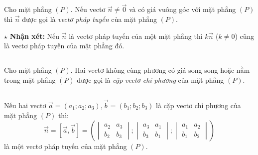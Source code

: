 \documentclass[12pt,a4paper]{extarticle}
\begin{document}
\makeheadbox[headerright={Chương 5},chude={Bài 1},tieude={Phương trình mặt phẳng},dinhdang={Hình học},lop={12 },gv={Nguyễn Lê Minh Ngọc}]
\vspace{2em}



\section*{\color{myblue}{I. Vectơ pháp tuyến, cặp vectơ chỉ phương của mặt phẳng}}
\subsection*{\color{myblue}{1. Vectơ pháp tuyến}}
\begin{tcolorbox}[colback=lightblue, colframe=myblue, arc=2mm]
Cho mặt phẳng $(P)$. Nếu vectơ $\vec{n} \neq \vec{0}$ và có giá vuông góc với mặt phẳng $(P)$ thì $\vec{n}$ được gọi là \textit{vectơ pháp tuyến} của mặt phẳng $(P)$.
\end{tcolorbox}
\noindent $\star$ \textbf{Nhận xét:} Nếu $\vec{n}$ là vectơ pháp tuyến của một mặt phẳng thì $k\vec{n}$ ($k \neq 0$) cũng là vectơ pháp tuyến của mặt phẳng đó.
\subsection*{\color{myblue}{2. Cặp vectơ chỉ phương}}
\begin{tcolorbox}[colback=lightblue, colframe=myblue, arc=2mm]
Cho mặt phẳng $(P)$. Hai vectơ không cùng phương có giá song song hoặc nằm trong mặt phẳng $(P)$ được gọi là \textit{cặp vectơ chỉ phương} của mặt phẳng $(P)$.
\end{tcolorbox}
\subsection*{\color{myblue}{3. Xác định vectơ pháp tuyến khi biết cặp vectơ chỉ phương}}
\begin{tcolorbox}[colback=lightblue, colframe=myblue, arc=2mm]
Nếu hai vectơ $\vec{a} = (a_1; a_2; a_3), \vec{b} = (b_1; b_2; b_3)$ là cặp vectơ chỉ phương của mặt phẳng $(P)$ thì:
\[
\vec{n} = [\vec{a}, \vec{b}] = \left( 
\begin{vmatrix} a_2 & a_3 \\ b_2 & b_3 \end{vmatrix}; 
\begin{vmatrix} a_3 & a_1 \\ b_3 & b_1 \end{vmatrix}; 
\begin{vmatrix} a_1 & a_2 \\ b_1 & b_2 \end{vmatrix} 
\right)
\]
là một vectơ pháp tuyến của mặt phẳng $(P)$.
\end{tcolorbox}
\vspace{0.4cm}
\end{document}
